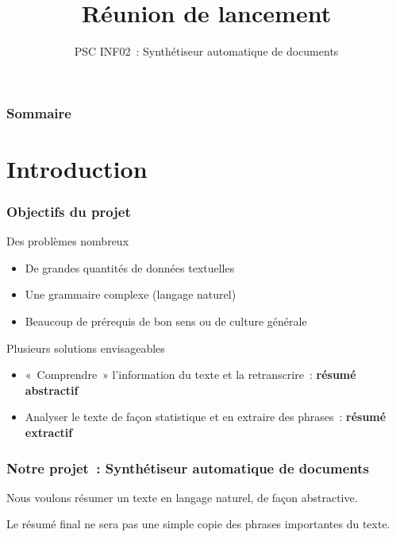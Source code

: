 \documentclass{beamer}
\title{Réunion de lancement}
\subtitle{PSC INF02~: Synthétiseur automatique de documents}
\author{}
\institute{École polytechnique}
\date{}
\begin{document}
\begin{frame}
  \titlepage{}

\end{frame}
\begin{frame}
\frametitle{Sommaire}
\tableofcontents
\end{frame}



\section{Introduction}

\begin{frame}%
\frametitle{Objectifs du projet}

\begin{block}{Des problèmes nombreux}
\begin{itemize}
 \item De grandes quantités de données textuelles
 \item Une grammaire complexe (langage naturel)
 \item Beaucoup de prérequis de bon sens ou de culture générale
\end{itemize}

\end{block}


\begin{block}{Plusieurs solutions envisageables}
\begin{itemize}
\item «~Comprendre~» l'information du texte et la retranscrire~: \textbf{résumé abstractif}
\item Analyser le texte de façon statistique et en extraire des phrases~: \textbf{résumé extractif}
\end{itemize}
\end{block}


\end{frame}


\begin{frame}
\frametitle{Notre projet~: Synthétiseur automatique de documents}

Nous voulons résumer un texte en langage naturel, de façon abstractive.

Le résumé final ne sera pas une simple copie des phrases importantes du texte.

\end{frame}
\end{document}
